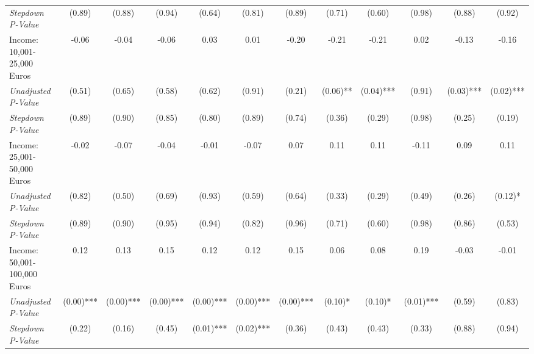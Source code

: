 \begin{tabular}{l c c c c c c c c c c c}
\quad \textit{Stepdown P-Value} & (0.89) & (0.88) & (0.94) & (0.64) & (0.81) & (0.89) & (0.71) & (0.60) & (0.98) & (0.88) & (0.92) \\
Income: 10,001-25,000 Euros & -0.06 & -0.04 & -0.06 & 0.03 & 0.01 & -0.20 & -0.21 & -0.21 & 0.02 & -0.13 & -0.16 \\
\quad \textit{Unadjusted P-Value} & (0.51) & (0.65) & (0.58) & (0.62) & (0.91) & (0.21) & (0.06)** & (0.04)*** & (0.91) & (0.03)*** & (0.02)*** \\
\quad \textit{Stepdown P-Value} & (0.89) & (0.90) & (0.85) & (0.80) & (0.89) & (0.74) & (0.36) & (0.29) & (0.98) & (0.25) & (0.19) \\
Income: 25,001-50,000 Euros & -0.02 & -0.07 & -0.04 & -0.01 & -0.07 & 0.07 & 0.11 & 0.11 & -0.11 & 0.09 & 0.11 \\
\quad \textit{Unadjusted P-Value} & (0.82) & (0.50) & (0.69) & (0.93) & (0.59) & (0.64) & (0.33) & (0.29) & (0.49) & (0.26) & (0.12)* \\
\quad \textit{Stepdown P-Value} & (0.89) & (0.90) & (0.95) & (0.94) & (0.82) & (0.96) & (0.71) & (0.60) & (0.98) & (0.86) & (0.53) \\
Income: 50,001-100,000 Euros & 0.12 & 0.13 & 0.15 & 0.12 & 0.12 & 0.15 & 0.06 & 0.08 & 0.19 & -0.03 & -0.01 \\
\quad \textit{Unadjusted P-Value} & (0.00)*** & (0.00)*** & (0.00)*** & (0.00)*** & (0.00)*** & (0.00)*** & (0.10)* & (0.10)* & (0.01)*** & (0.59) & (0.83) \\
\quad \textit{Stepdown P-Value} & (0.22) & (0.16) & (0.45) & (0.01)*** & (0.02)*** & (0.36) & (0.43) & (0.43) & (0.33) & (0.88) & (0.94) \\
\bottomrule
\end{tabular}

